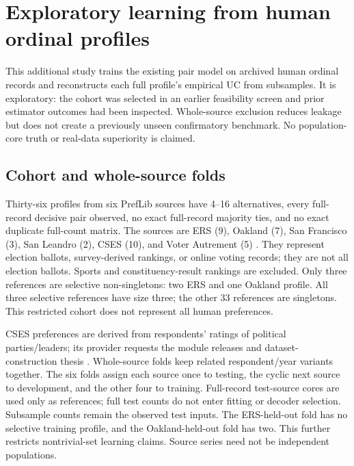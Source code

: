 \section{Exploratory learning from human ordinal profiles}\label{app:real-learning}
This additional study trains the existing pair model on archived human ordinal records and reconstructs each full profile's empirical UC from subsamples. It is exploratory: the cohort was selected in an earlier feasibility screen and prior estimator outcomes had been inspected. Whole-source exclusion reduces leakage but does not create a previously unseen confirmatory benchmark. No population-core truth or real-data superiority is claimed.

\subsection{Cohort and whole-source folds}
Thirty-six profiles from six PrefLib sources have 4--16 alternatives, every full-record decisive pair observed, no exact full-record majority ties, and no exact duplicate full-count matrix. The sources are ERS (9), Oakland (7), San Francisco (3), San Leandro (2), CSES (10), and Voter Autrement (5) \citep{mattei2013preflib,preflibers,oneill2013openstv,preflibcses,preflibvoterautrement}. They represent election ballots, survey-derived rankings, or online voting records; they are not all election ballots. Sports and constituency-result rankings are excluded. Only three references are selective non-singletons: two ERS and one Oakland profile. All three selective references have size three; the other 33 references are singletons. This restricted cohort does not represent all human preferences.

CSES preferences are derived from respondents' ratings of political parties/leaders; its provider requests the module releases and dataset-construction thesis \citep{csesmodule1,csesmodule2,csesmodule3,csesmodule4,csesmodule5,boehmer2023thesis}. Whole-source folds keep related respondent/year variants together. The six folds assign each source once to testing, the cyclic next source to development, and the other four to training. Full-record test-source cores are used only as references; full test counts do not enter fitting or decoder selection. Subsample counts remain the observed test inputs. The ERS-held-out fold has no selective training profile, and the Oakland-held-out fold has two. This further restricts nontrivial-set learning claims. Source series need not be independent populations.

